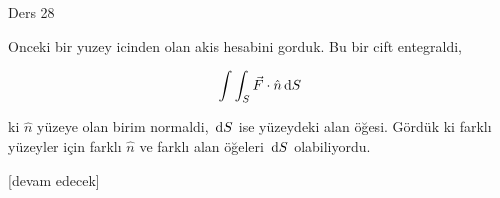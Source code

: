 \documentclass[12pt,fleqn]{article}\usepackage{../../common}
\begin{document}
Ders 28

Onceki bir yuzey icinden olan akis hesabini gorduk. Bu bir cift entegraldi,

$$
\int \int_S \vec{F} \cdot \hat{n} \,\mathrm{d} S
$$

ki $\hat{n}$ yüzeye olan birim normaldi, $\,\mathrm{d} S$ ise yüzeydeki alan öğesi.
Gördük ki farklı yüzeyler için farklı $\hat{n}$ ve farklı alan öğeleri
$\,\mathrm{d} S$ olabiliyordu. 














[devam edecek]
\end{document}
